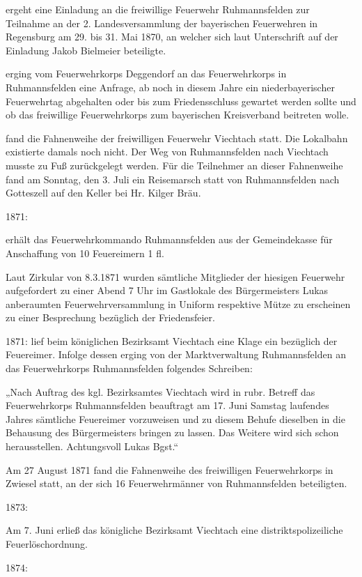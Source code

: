 ergeht eine Einladung an die freiwillige Feuerwehr Ruhmannsfelden zur Teilnahme
an der 2. Landesversammlung der bayerischen Feuerwehren in Regensburg am 29. bis
31. Mai 1870, an welcher sich laut Unterschrift auf der Einladung Jakob
Bielmeier beteiligte.

erging vom Feuerwehrkorps Deggendorf an das Feuerwehrkorps in Ruhmannsfelden
eine Anfrage, ab noch in diesem Jahre ein niederbayerischer Feuerwehrtag
abgehalten oder bis zum Friedensschluss gewartet werden sollte und ob das
freiwillige Feuerwehrkorps zum bayerischen Kreisverband beitreten wolle.

fand die Fahnenweihe der freiwilligen Feuerwehr Viechtach statt. Die Lokalbahn
existierte damals noch nicht. Der Weg von Ruhmannsfelden nach Viechtach musste
zu Fuß zurückgelegt werden. Für die Teilnehmer an dieser Fahnenweihe fand am
Sonntag, den 3. Juli ein Reisemarsch statt von Ruhmannsfelden nach Gotteszell
auf den Keller bei Hr. Kilger Bräu.

1871:

erhält das Feuerwehrkommando Ruhmannsfelden aus der Gemeindekasse für
Anschaffung von 10 Feuereimern 1 fl.

    Laut Zirkular von 8.3.1871 wurden sämtliche Mitglieder der hiesigen
    Feuerwehr aufgefordert zu einer Abend 7 Uhr im Gastlokale des Bürgermeisters
    Lukas anberaumten Feuerwehrversammlung in Uniform respektive Mütze zu
    erscheinen zu einer Besprechung bezüglich der Friedensfeier.

1871:   lief beim königlichen Bezirksamt Viechtach eine Klage ein bezüglich der
Feuereimer. Infolge dessen erging von der Marktverwaltung Ruhmannsfelden an das
Feuerwehrkorps Ruhmannsfelden folgendes Schreiben:

„Nach Auftrag des kgl. Bezirksamtes Viechtach wird in rubr. Betreff das
Feuerwehrkorps Ruhmannsfelden beauftragt am 17. Juni Samstag laufendes Jahres
sämtliche Feuereimer vorzuweisen und zu diesem Behufe dieselben in die Behausung
des Bürgermeisters bringen zu lassen. Das Weitere wird sich schon herausstellen.
Achtungsvoll Lukas Bgst.“

Am 27 August 1871 fand die Fahnenweihe des freiwilligen Feuerwehrkorps in
Zwiesel statt, an der sich 16 Feuerwehrmänner von Ruhmannsfelden beteiligten.

1873:

Am 7. Juni erließ das königliche Bezirksamt Viechtach eine distriktspolizeiliche
Feuerlöschordnung.

1874:

